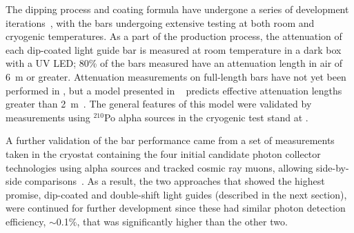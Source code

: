The dipping process and coating formula have undergone a series of development iterations~\cite{Moss:2014ota},
with the bars undergoing extensive testing at both room and cryogenic temperatures.
As a part of the production process, the attenuation of each dip-coated light guide bar is measured at room temperature in a dark box with a UV LED; 80\% of the bars measured have an attenuation length in air of \SI{6}{m} or greater.   
Attenuation measurements on full-length bars have not yet been performed in \lar, but a model presented in ~\cite{Moss:2014ota} predicts effective attenuation lengths greater than \SI{2}{m}~\cite{Moss:2016yhb}.  The general features of this model were validated by measurements using $^{210}$Po alpha sources in the  cryogenic test stand at .

A further validation of the bar performance came from a set of measurements taken in the  cryostat containing the four initial candidate photon collector technologies using alpha sources and tracked cosmic ray muons, allowing side-by-side comparisons~\cite{Whittington:2015rkr}.  As a result, the two approaches that showed the highest promise, dip-coated and double-shift light guides (described in the next section), were continued for further development since these had similar photon detection efficiency, $\sim$0.1\%, that was significantly higher than the other two. 




